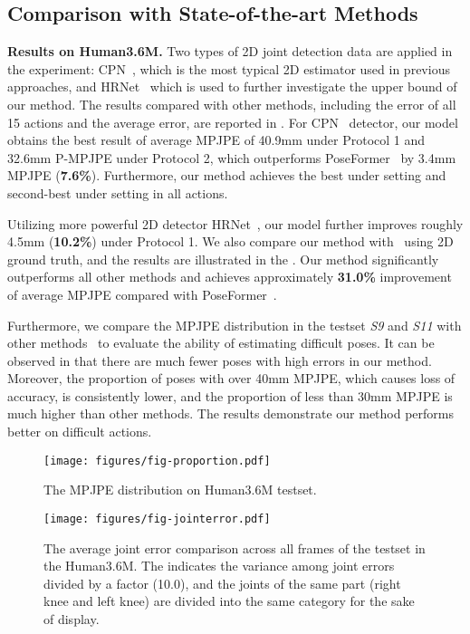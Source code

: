 \documentclass[10pt,twocolumn,letterpaper]{article}
\begin{document}
	\subsection{Comparison with State-of-the-art Methods}
\textbf{Results on Human3.6M.} 
	Two types of 2D joint detection data are applied in the experiment: CPN~\cite{chen2018cascaded}, which is the most typical 2D estimator used in previous approaches, and HRNet~\cite{sun2019deep} which is used to further investigate the upper bound of our method. 
	The results compared with other methods, including the error of all 15 actions and the average error, are reported in .
For CPN~\cite{chen2018cascaded} detector, our model obtains the best result of average MPJPE of 40.9mm under Protocol 1 and 32.6mm P-MPJPE under Protocol 2, which outperforms PoseFormer~\cite{poseformer} by 3.4mm MPJPE (\textbf{7.6\%}).
	Furthermore, our method achieves the best under  setting and second-best under  setting in all actions.
	
	Utilizing more powerful 2D detector HRNet~\cite{sun2019deep}, our model further improves roughly 4.5mm (\textbf{10.2\%}) under Protocol 1.
We also compare our method with~\cite{videopose3d,poseformer,attentionmechanism,anatomypose,motionguidepose} using 2D ground truth, and the results are illustrated in the .
	Our method significantly outperforms all other methods and achieves approximately \textbf{31.0\%} improvement of average MPJPE compared with PoseFormer~\cite{poseformer}.




	Furthermore, we compare	the MPJPE distribution in the testset \textit{S9} and \textit{S11} with other methods~\cite{poseformer,videopose3d} to evaluate the ability of estimating difficult poses. 
	It can be observed in  that there are much	fewer poses with high errors in our method.
	Moreover, the proportion of poses with over 40mm MPJPE, which causes loss of accuracy, is consistently lower, and the proportion of less than 30mm MPJPE is much higher than other methods.
	The results demonstrate our method performs better on difficult actions.
	
	\begin{figure}[htp]
		\centering
\texttt{[image: figures/fig-proportion.pdf]}
		\vspace{-0.8cm}
		\caption{The MPJPE distribution on Human3.6M testset.}
		\label{fig:proportion}
		\vspace{-0.3cm}
	\end{figure}
	\begin{figure}[htp]
		\centering
\texttt{[image: figures/fig-jointerror.pdf]}
		\vspace{-0.8cm}
		\caption{
			The average joint error comparison across all frames of the testset in the Human3.6M. 
			The  indicates the variance among joint errors divided by a factor (10.0), and the joints of the same part (\eg right knee and left knee) are divided into the same category for the sake of display.
		}
		\label{fig:jointserror}
\end{figure}
	
\end{document}
